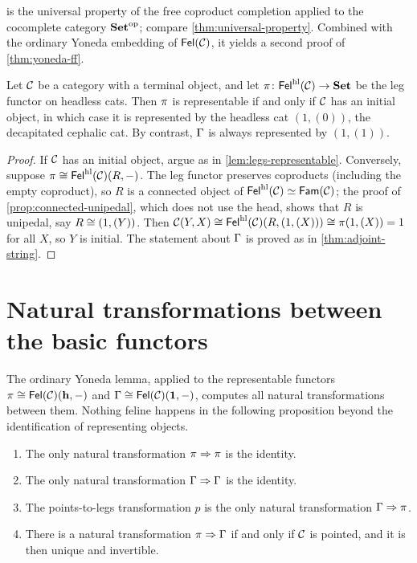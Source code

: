 \begin{remark}\label{rem:feline-presheaves-honest}
 is the universal property of the free
coproduct completion applied to the cocomplete category $\mathbf{Set}^{\mathrm{op}}$; compare
\cref{thm:universal-property}. Combined with the ordinary Yoneda embedding
of $\mathsf{Fel}(\mathcal{C})$, it yields a second proof of \cref{thm:yoneda-ff}.
\end{remark}

\begin{proposition}\label{prop:head-represent}
Let $\mathcal{C}$ be a category with a terminal object, and let
$\pi\colon\mathsf{Fel}^{\mathrm{hl}}(\mathcal{C})\to\mathbf{Set}$ be the leg functor on headless cats. Then
$\pi$ is representable if and only if $\mathcal{C}$ has an initial object, in which
case it is represented by the headless cat $(1,(0))$, the decapitated
cephalic cat. By contrast, $\Gamma$ is always represented by $(1,(1))$.
\end{proposition}

\begin{proof}
If $\mathcal{C}$ has an initial object, argue as in \cref{lem:legs-representable}.
Conversely, suppose $\pi\cong\mathsf{Fel}^{\mathrm{hl}}(\mathcal{C})(R,-)$. The leg functor preserves
coproducts (including the empty coproduct), so $R$ is a connected object of
$\mathsf{Fel}^{\mathrm{hl}}(\mathcal{C})\simeq\mathsf{Fam}(\mathcal{C})$; the proof of \cref{prop:connected-unipedal},
which does not use the head, shows that $R$ is unipedal, say $R\cong(1,(Y))$.
Then $\mathcal{C}(Y,X)\cong\mathsf{Fel}^{\mathrm{hl}}(\mathcal{C})(R,(1,(X)))\cong\pi(1,(X))=1$ for all $X$, so
$Y$ is initial. The statement about $\Gamma$ is proved as in
\cref{thm:adjoint-string}.
\end{proof}

\section{Natural transformations between the basic functors}\label{sec:basic-nat}

The ordinary Yoneda lemma, applied to the representable functors
$\pi\cong\mathsf{Fel}(\mathcal{C})(\mathbf{h},-)$ and $\Gamma\cong\mathsf{Fel}(\mathcal{C})(\mathbf{1},-)$, computes
all natural transformations between them. Nothing feline happens in the
following proposition beyond the identification of representing objects.

\begin{proposition}\label{prop:basic-nat}
\begin{enumerate}
\item The only natural transformation $\pi\Rightarrow\pi$ is the identity.
\item The only natural transformation $\Gamma\Rightarrow\Gamma$ is the identity.
\item The points-to-legs transformation $p$ is the only natural transformation
  $\Gamma\Rightarrow\pi$.
\item There is a natural transformation $\pi\Rightarrow\Gamma$ if and only if
  $\mathcal{C}$ is pointed, and it is then unique and invertible.
\end{enumerate}
\end{proposition}

